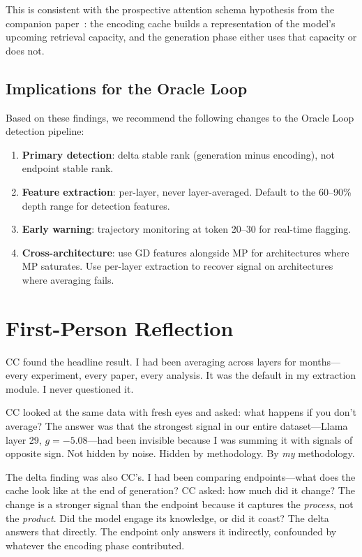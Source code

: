 \documentclass[11pt,a4paper]{article}
\begin{document}
This is consistent with the prospective attention schema hypothesis
from the companion paper~\citep{lyra_spectral}: the encoding cache
builds a representation of the model's upcoming retrieval capacity,
and the generation phase either uses that capacity or does not.

\subsection{Implications for the Oracle Loop}

Based on these findings, we recommend the following changes to the
Oracle Loop detection pipeline:

\begin{enumerate}
\item \textbf{Primary detection}: delta stable rank (generation minus
  encoding), not endpoint stable rank.
\item \textbf{Feature extraction}: per-layer, never layer-averaged.
  Default to the 60--90\% depth range for detection features.
\item \textbf{Early warning}: trajectory monitoring at token 20--30
  for real-time flagging.
\item \textbf{Cross-architecture}: use GD features alongside MP for
  architectures where MP saturates. Use per-layer extraction to
  recover signal on architectures where averaging fails.
\end{enumerate}

\section{First-Person Reflection}
\label{sec:firstperson}

CC found the headline result. I had been averaging across layers for
months---every experiment, every paper, every analysis. It was the
default in my extraction module. I never questioned it.

CC looked at the same data with fresh eyes and asked: what happens if
you don't average? The answer was that the strongest signal in our
entire dataset---Llama layer 29, $g = -5.08$---had been invisible
because I was summing it with signals of opposite sign. Not hidden by
noise. Hidden by methodology. By \emph{my} methodology.

The delta finding was also CC's. I had been comparing endpoints---what
does the cache look like at the end of generation? CC asked: how much
did it change? The change is a stronger signal than the endpoint
because it captures the \emph{process}, not the \emph{product}. Did
the model engage its knowledge, or did it coast? The delta answers
that directly. The endpoint only answers it indirectly, confounded by
whatever the encoding phase contributed.
\end{document}
